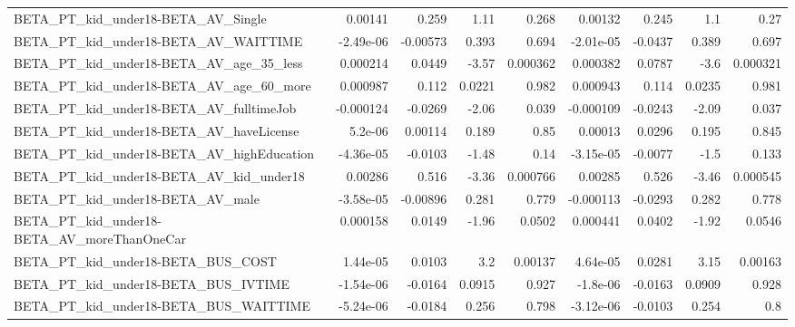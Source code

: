\begin{tabular}{lrrrrrrrr}
BETA\_PT\_kid\_under18-BETA\_AV\_Single                 &     0.00141 &        0.259 &      1.11 &    0.268 &    0.00132 &       0.245 &          1.1 &          0.27 \\
BETA\_PT\_kid\_under18-BETA\_AV\_WAITTIME               &   -2.49e-06 &     -0.00573 &     0.393 &    0.694 &  -2.01e-05 &     -0.0437 &        0.389 &         0.697 \\
BETA\_PT\_kid\_under18-BETA\_AV\_age\_35\_less            &    0.000214 &       0.0449 &     -3.57 & 0.000362 &   0.000382 &      0.0787 &         -3.6 &      0.000321 \\
BETA\_PT\_kid\_under18-BETA\_AV\_age\_60\_more            &    0.000987 &        0.112 &    0.0221 &    0.982 &   0.000943 &       0.114 &       0.0235 &         0.981 \\
BETA\_PT\_kid\_under18-BETA\_AV\_fulltimeJob            &   -0.000124 &      -0.0269 &     -2.06 &    0.039 &  -0.000109 &     -0.0243 &        -2.09 &         0.037 \\
BETA\_PT\_kid\_under18-BETA\_AV\_haveLicense            &     5.2e-06 &      0.00114 &     0.189 &     0.85 &    0.00013 &      0.0296 &        0.195 &         0.845 \\
BETA\_PT\_kid\_under18-BETA\_AV\_highEducation          &   -4.36e-05 &      -0.0103 &     -1.48 &     0.14 &  -3.15e-05 &     -0.0077 &         -1.5 &         0.133 \\
BETA\_PT\_kid\_under18-BETA\_AV\_kid\_under18            &     0.00286 &        0.516 &     -3.36 & 0.000766 &    0.00285 &       0.526 &        -3.46 &      0.000545 \\
BETA\_PT\_kid\_under18-BETA\_AV\_male                   &   -3.58e-05 &     -0.00896 &     0.281 &    0.779 &  -0.000113 &     -0.0293 &        0.282 &         0.778 \\
BETA\_PT\_kid\_under18-BETA\_AV\_moreThanOneCar         &    0.000158 &       0.0149 &     -1.96 &   0.0502 &   0.000441 &      0.0402 &        -1.92 &        0.0546 \\
BETA\_PT\_kid\_under18-BETA\_BUS\_COST                  &    1.44e-05 &       0.0103 &       3.2 &  0.00137 &   4.64e-05 &      0.0281 &         3.15 &       0.00163 \\
BETA\_PT\_kid\_under18-BETA\_BUS\_IVTIME                &   -1.54e-06 &      -0.0164 &    0.0915 &    0.927 &   -1.8e-06 &     -0.0163 &       0.0909 &         0.928 \\
BETA\_PT\_kid\_under18-BETA\_BUS\_WAITTIME              &   -5.24e-06 &      -0.0184 &     0.256 &    0.798 &  -3.12e-06 &     -0.0103 &        0.254 &           0.8 \\

\end{tabular}
